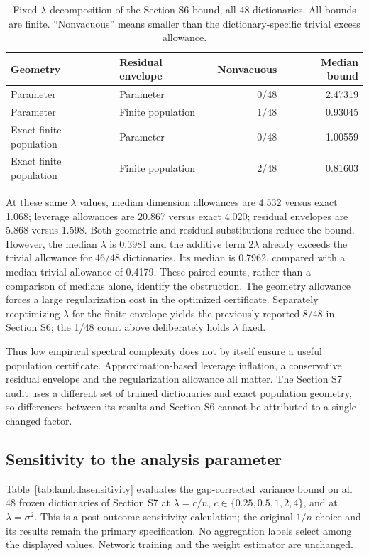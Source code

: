 \documentclass[pdflatex,sn-mathphys-ay]{sn-jnl}
\theoremstyle{remark}\newtheorem{remark}[theorem]{Remark}
\begin{document}
\begin{table}[htbp]\centering\small
\caption{Fixed-$\lambda$ decomposition of the Section S6 bound, all 48 dictionaries. All bounds are finite. ``Nonvacuous'' means smaller than the dictionary-specific trivial excess allowance.}\label{tab:jointdiagnostic}
\begin{tabular}{llrr}\toprule
Geometry & Residual envelope & Nonvacuous & Median bound\\\midrule
Parameter & Parameter & 0/48 & 2.47319\\
Parameter & Finite population & 1/48 & 0.93045\\
Exact finite population & Parameter & 0/48 & 1.00559\\
Exact finite population & Finite population & 2/48 & 0.81603\\\bottomrule
\end{tabular}\end{table}

At these same $\lambda$ values, median dimension allowances are 4.532 versus exact 1.068; leverage allowances are 20.867 versus exact 4.020; residual envelopes are 5.868 versus 1.598. Both geometric and residual substitutions reduce the bound. However, the median $\lambda$ is 0.3981 and the additive term $2\lambda$ already exceeds the trivial allowance for 46/48 dictionaries. Its median is 0.7962, compared with a median trivial allowance of 0.4179. These paired counts, rather than a comparison of medians alone, identify the obstruction. The geometry allowance forces a large regularization cost in the optimized certificate. Separately reoptimizing $\lambda$ for the finite envelope yields the previously reported 8/48 in Section S6; the 1/48 count above deliberately holds $\lambda$ fixed.

Thus low empirical spectral complexity does not by itself ensure a useful population certificate. Approximation-based leverage inflation, a conservative residual envelope and the regularization allowance all matter. The Section S7 audit uses a different set of trained dictionaries and exact population geometry, so differences between its results and Section S6 cannot be attributed to a single changed factor.

\subsection{Sensitivity to the analysis parameter}
Table~\ref{tab:lambdasensitivity} evaluates the gap-corrected variance bound on all 48 frozen dictionaries of Section S7 at $\lambda=c/n$, $c\in\{0.25,0.5,1,2,4\}$, and at $\lambda=\sigma^2$. This is a post-outcome sensitivity calculation; the original $1/n$ choice and its results remain the primary specification. No aggregation labels select among the displayed values. Network training and the weight estimator are unchanged.
\end{document}
